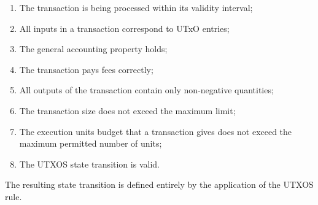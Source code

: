 \begin{enumerate}
  \item The transaction is being processed within its validity interval;

  \item All inputs in a transaction correspond to UTxO entries;

  \item The general accounting property holds;

  \item The transaction pays fees correctly;

  \item All outputs of the transaction contain only non-negative quantities;

  \item The transaction size does not exceed the maximum limit;

 \item The execution units budget that a transaction gives does not exceed the maximum
  permitted number of units;

  \item The UTXOS state transition is valid.
\end{enumerate}

The resulting state transition is defined entirely by the application of the
UTXOS rule.


